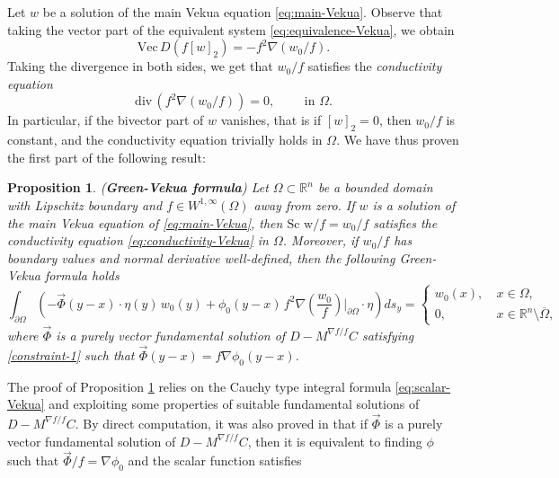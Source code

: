 \documentclass[12pt]{article}
\newtheorem{proposition}[theorem]{Proposition}
\def\div{\mbox{div}\,}
\def\C{\mathbb{C}}
\def\D{\mathbb{D}}
\def\R{\mathbb{R}}
\def\Vec{\mbox{Vec}\,}
\begin{document}

Let $w$ be a solution of the main Vekua equation \eqref{eq:main-Vekua}. Observe that taking the vector part of the equivalent system \eqref{eq:equivalence-Vekua}, we obtain 
\[
 \Vec D\left(f [w]_2\right)=-f^2\nabla(w_0/f).
\]
Taking the divergence in both sides, we get that $w_0/f$ satisfies the \textit{conductivity equation}
\begin{equation}\label{eq:conductivity-Vekua}
    \div(f^2 \nabla (w_0/f))=0, \qquad \text{ in }\Omega.
\end{equation}
In particular, if the bivector part of $w$ vanishes, that is if $[w]_2= 0$, then $w_0/f$ is constant, and the conductivity equation trivially holds in $\Omega$. We have thus proven the first part of the following result:
\begin{proposition}(\textbf{Green-Vekua formula})\label{prop:Green-Vekua} \cite{Delgado-Moreira}
Let $\Omega\subset \mathbb{R}^n$ be a bounded domain with Lipschitz boundary and $f\in W^{1,\infty}(\Omega)$ away from zero. If $w$ is a solution of the main Vekua equation of \eqref{eq:main-Vekua}, then $\text{Sc w}/f=w_0/f$ satisfies the conductivity equation \eqref{eq:conductivity-Vekua} in $\Omega$. Moreover, if $w_0/f$ has boundary values and normal derivative well-defined, then the following Green-Vekua formula holds
\begin{equation}\label{eq:Green-Vekua-2}
\int_{\partial \Omega}  \left(- \vec \Phi(y-x)\cdot \eta(y)\, w_0(y)+\phi_0(y-x)\, f^2 \nabla\left(\dfrac{w_0}{f}\right)\Big|_{\partial\Omega}\cdot \eta\right) ds_{y}=\left\{
   \begin{array}{ll}
      w_{0}(x), \ & x\in \Omega,\\
      0,           & x\in \R^n\setminus \overline{\Omega},
   \end{array}
\right.
\end{equation}
where $\vec \Phi$ is a purely vector fundamental solution of $D-M^{\nabla f/f} C$ satisfying \eqref{constraint-1} such that $\vec \Phi(y-x)=f\nabla \phi_0(y-x)$.
\end{proposition}
The proof of Proposition \ref{prop:Green-Vekua} relies on the Cauchy type integral formula \ref{eq:scalar-Vekua} and exploiting some properties of suitable fundamental solutions of $D-M^{\nabla f/f} C$. By direct computation, it was also proved in \cite{Delgado-Moreira} that if $\vec \Phi$ is a purely vector fundamental solution of $D-M^{\nabla f/f} C$, then it is equivalent to finding $\phi$ such that $\vec \Phi/f=\nabla \phi_0$ and the scalar function satisfies
\end{document}
